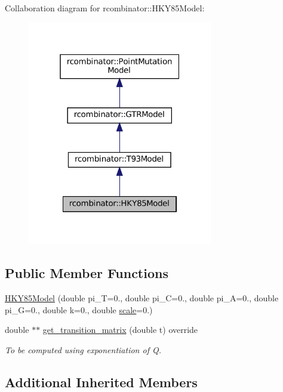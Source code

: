 Collaboration diagram for rcombinator\+:\+:H\+K\+Y85\+Model\+:\nopagebreak
\begin{figure}[H]
\begin{center}
\leavevmode
\includegraphics[width=229pt]{classrcombinator_1_1HKY85Model__coll__graph}
\end{center}
\end{figure}
\subsection*{Public Member Functions}
\begin{DoxyCompactItemize}
\item 
\mbox{\hyperlink{classrcombinator_1_1HKY85Model_aba3aea50215010285dd40b4093bf55c1}{H\+K\+Y85\+Model}} (double pi\+\_\+T=0., double pi\+\_\+C=0., double pi\+\_\+A=0., double pi\+\_\+G=0., double k=0., double \mbox{\hyperlink{classrcombinator_1_1PointMutationModel_a328a30a438bb1b6a625faa3f714a85c8}{scale}}=0.)
\item 
\mbox{\label{classrcombinator_1_1HKY85Model_a156ac5c3789bc479857299469269c4de}} 
double $\ast$$\ast$ \mbox{\hyperlink{classrcombinator_1_1HKY85Model_a156ac5c3789bc479857299469269c4de}{get\+\_\+transition\+\_\+matrix}} (double t) override
\begin{DoxyCompactList}\small\item\em To be computed using exponentiation of Q. \end{DoxyCompactList}\end{DoxyCompactItemize}
\subsection*{Additional Inherited Members}


